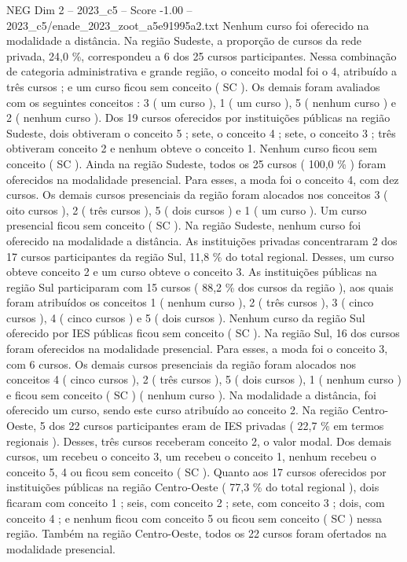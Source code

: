 \begin{textsample}{NEG Dim 2 – 2023\_c5 – Score -1.00 – 2023\_c5/enade\_2023\_zoot\_a5e91995a2.txt}
Nenhum curso foi oferecido na modalidade a distância.
Na região Sudeste, a proporção de cursos da rede privada, 24,0 \%, correspondeu a 6 dos 25 cursos participantes.
Nessa combinação de categoria administrativa e grande região, o conceito modal foi o 4, atribuído a três cursos ; e um curso ficou sem conceito ( SC ).
Os demais foram avaliados com os seguintes conceitos : 3 ( um curso ), 1 ( um curso ), 5 ( nenhum curso ) e 2 ( nenhum curso ).
Dos 19 cursos oferecidos por instituições públicas na região Sudeste, dois obtiveram o conceito 5 ; sete, o conceito 4 ; sete, o conceito 3 ; três obtiveram conceito 2 e nenhum obteve o conceito 1.
Nenhum curso ficou sem conceito ( SC ).
Ainda na região Sudeste, todos os 25 cursos ( 100,0 \% ) foram oferecidos na modalidade presencial.
Para esses, a moda foi o conceito 4, com dez cursos.
Os demais cursos presenciais da região foram alocados nos conceitos 3 ( oito cursos ), 2 ( três cursos ), 5 ( dois cursos ) e 1 ( um curso ).
Um curso presencial ficou sem conceito ( SC ).
Na região Sudeste, nenhum curso foi oferecido na modalidade a distância.
As instituições privadas concentraram 2 dos 17 cursos participantes da região Sul, 11,8 \% do total regional.
Desses, um curso obteve conceito 2 e um curso obteve o conceito 3.
As instituições públicas na região Sul participaram com 15 cursos ( 88,2 \% dos cursos da região ), aos quais foram atribuídos os conceitos 1 ( nenhum curso ), 2 ( três cursos ), 3 ( cinco cursos ), 4 ( cinco cursos ) e 5 ( dois cursos ).
Nenhum curso da região Sul oferecido por IES públicas ficou sem conceito ( SC ).
Na região Sul, 16 dos cursos foram oferecidos na modalidade presencial.
Para esses, a moda foi o conceito 3, com 6 cursos.
Os demais cursos presenciais da região foram alocados nos conceitos 4 ( cinco cursos ), 2 ( três cursos ), 5 ( dois cursos ), 1 ( nenhum curso ) e ficou sem conceito ( SC ) ( nenhum curso ).
Na modalidade a distância, foi oferecido um curso, sendo este curso atribuído ao conceito 2.
Na região Centro-Oeste, 5 dos 22 cursos participantes eram de IES privadas ( 22,7 \% em termos regionais ).
Desses, três cursos receberam conceito 2, o valor modal.
Dos demais cursos, um recebeu o conceito 3, um recebeu o conceito 1, nenhum recebeu o conceito 5, 4 ou ficou sem conceito ( SC ).
Quanto aos 17 cursos oferecidos por instituições públicas na região Centro-Oeste ( 77,3 \% do total regional ), dois ficaram com conceito 1 ; seis, com conceito 2 ; sete, com conceito 3 ; dois, com conceito 4 ; e nenhum ficou com conceito 5 ou ficou sem conceito ( SC ) nessa região.
Também na região Centro-Oeste, todos os 22 cursos foram ofertados na modalidade presencial.

\end{textsample}
